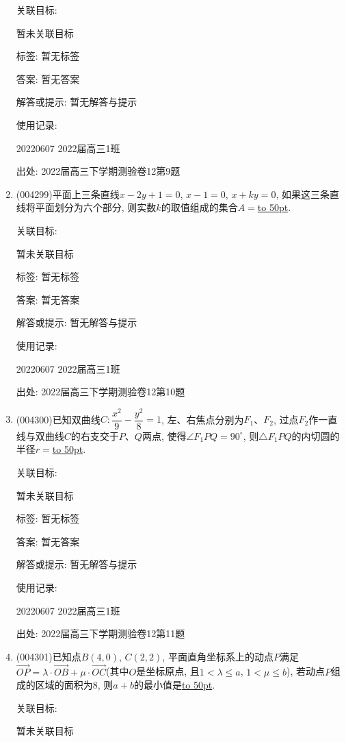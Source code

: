 \documentclass[10pt,a4paper]{article}
\newcommand{\blank}[1]{\underline{\hbox to #1pt{}}}
\begin{document}
\begin{enumerate}[1.]
关联目标:

暂未关联目标



标签: 暂无标签

答案: 暂无答案

解答或提示: 暂无解答与提示

使用记录:

20220607	2022届高三1班	


出处: 2022届高三下学期测验卷12第9题
\item { (004299)}平面上三条直线$x-2y+1=0$, $x-1=0$, $x+ky=0$, 如果这三条直线将平面划分为六个部分, 则实数$k$的取值组成的集合$A=$\blank{50}.


关联目标:

暂未关联目标



标签: 暂无标签

答案: 暂无答案

解答或提示: 暂无解答与提示

使用记录:

20220607	2022届高三1班	


出处: 2022届高三下学期测验卷12第10题
\item { (004300)}已知双曲线$C: \dfrac{x^2}9-\dfrac{y^2}8=1$, 左、右焦点分别为$F_1$、$F_2$, 过点$F_2$作一直线与双曲线$C$的右支交于$P$、$Q$两点, 使得$\angle F_1PQ=90^\circ$, 则$\triangle F_1PQ$的内切圆的半径$r=$\blank{50}.


关联目标:

暂未关联目标



标签: 暂无标签

答案: 暂无答案

解答或提示: 暂无解答与提示

使用记录:

20220607	2022届高三1班	


出处: 2022届高三下学期测验卷12第11题
\item { (004301)}已知点$B(4,0)$, $C(2,2)$, 平面直角坐标系上的动点$P$满足$\overrightarrow{OP}=\lambda \cdot \overrightarrow{OB}+\mu \cdot \overrightarrow{OC}$(其中$O$是坐标原点, 且$1<\lambda \le a$, $1<\mu \le b$), 若动点$P$组成的区域的面积为$8$, 则$a+b$的最小值是\blank{50}.


关联目标:

暂未关联目标




\end{enumerate}
\end{document}
